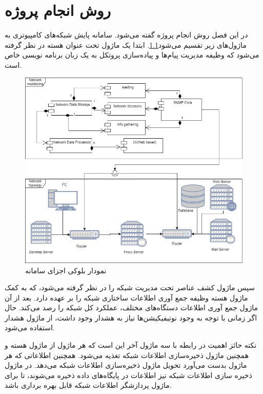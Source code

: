 \chapter{روش انجام پروژه }

در این فصل روش انجام پروژه گفته می‌شود. سامانه پایش شبکه‌های کامپیوتری به ماژول‌های زیر تقسیم می‌شود\cref{fig.11}. ابتدا یک ماژول تحت عنوان هسته  در نظر گرفته می‌شود که وظیفه مدیریت پیام‌ها و پیاده‌سازی پروتکل به یک زبان برنامه نویسی خاص است.




\begin{figure}[!h]
\centering\includegraphics[scale=.55]{./diagram}
\caption{نمودار بلوکی اجزای سامانه}\label{fig.11}
\end{figure}


سپس ماژول کشف عناصر تحت مدیریت شبکه را در نظر گرفته می‌شود، که به کمک ماژول هسته وظیفه جمع آوری اطلاعات ساختاری شبکه را بر عهده دارد. بعد از آن ماژول جمع آوری اطلاعات دستگاه‌های مختلف، عملکرد کل شبکه را رصد می‌کند. حال اگر زمانی با توجه به وجود نوتیفیکیشن‌ها نیاز به هشدار وجود داشت، از ماژول هشدار استفاده می‌شود. 

\newpage

نکته حائز اهمیت در رابطه با سه ماژول آخر این است که هر ماژول از ماژول هسته و همچنین ماژول ذخیره‌سازی اطلاعات شبکه تغذیه می‌شود. همچنین اطلاعاتی که هر ماژول بدست می‌آورد تحویل ماژول ذخیره‌سازی اطلاعات شبکه می‌دهد. در ماژول ذخیره سازی اطلاعات شبکه نیز اطلاعات در پایگاه‌های داده ذخیره می‌شوند، تا برای ماژول پردازشگر اطلاعات شبکه قابل بهره برداری باشد.

